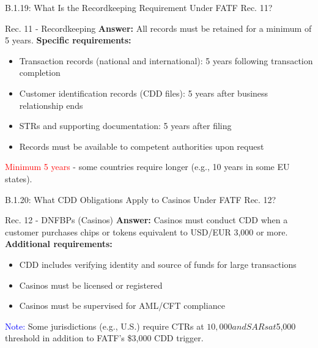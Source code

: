 \documentclass{beamer}
\begin{document}
	\begin{frame}{B.1.19: What Is the Recordkeeping Requirement Under FATF Rec. 11?}
		\begin{block}{Rec. 11 - Recordkeeping}
			\textbf{Answer:} All records must be retained for a minimum of 5 years.
			\vspace{0.2cm}
			\textbf{Specific requirements:}
			\begin{itemize}
				\item Transaction records (national and international): 5 years following transaction completion
				\item Customer identification records (CDD files): 5 years after business relationship ends
				\item STRs and supporting documentation: 5 years after filing
				\item Records must be available to competent authorities upon request
			\end{itemize}
			\textcolor{red}{Minimum 5 years} - some countries require longer (e.g., 10 years in some EU states).
		\end{block}
	\end{frame}
	
	\begin{frame}{B.1.20: What CDD Obligations Apply to Casinos Under FATF Rec. 12?}
		\begin{block}{Rec. 12 - DNFBPs (Casinos)}
			\textbf{Answer:} Casinos must conduct CDD when a customer purchases chips or tokens equivalent to USD/EUR 3,000 or more.
			\vspace{0.2cm}
			\textbf{Additional requirements:}
			\begin{itemize}
				\item CDD includes verifying identity and source of funds for large transactions
				\item Casinos must be licensed or registered
				\item Casinos must be supervised for AML/CFT compliance
			\end{itemize}
			\textcolor{blue}{Note:} Some jurisdictions (e.g., U.S.) require CTRs at $10,000 and SARs at $5,000 threshold in addition to FATF's \$3,000 CDD trigger.
		\end{block}
	\end{frame}
	
\end{document}
